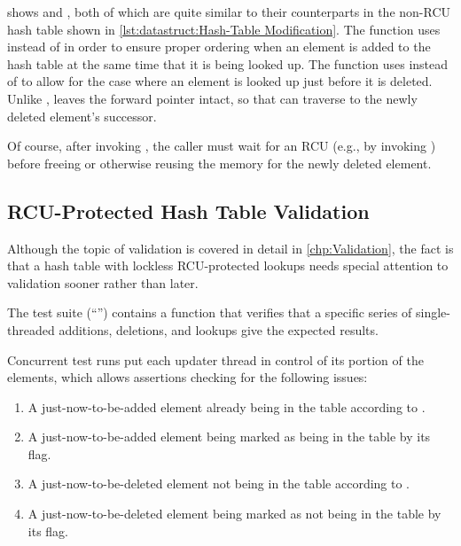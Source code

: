 shows  and , both of which
are quite similar to their counterparts in the non-RCU hash table
shown in
\cref{lst:datastruct:Hash-Table Modification}.
The  function uses  instead
of  in order to ensure proper ordering when
an element is added to the hash table at the same time that it is
being looked up.
The  function uses  instead
of  to allow for the case where an element is
looked up just before it is deleted.
Unlike ,  leaves the
forward pointer intact, so that  can traverse
to the newly deleted element's successor.

Of course, after invoking , the caller must wait for
an RCU  (e.g., by invoking ) before
freeing or otherwise reusing the memory for the newly deleted element.

\subsection{RCU-Protected Hash Table Validation}
\label{sec:datastruct:RCU-Protected Hash Table Validation}

Although the topic of validation is covered in detail in
\cref{chp:Validation}, the fact is that a hash table with lockless
RCU-protected lookups needs special attention to validation sooner rather
than later.

The test suite (``'') contains a 
function that verifies that a specific series of single-threaded
additions, deletions, and lookups give the expected results.

Concurrent test runs put each updater thread in control of its portion of
the elements, which allows assertions checking for the following issues:

\begin{enumerate}
\item	A just-now-to-be-added element already being in the table
	according to .
\item	A just-now-to-be-added element being marked as being in the
	table by its  flag.
\item	A just-now-to-be-deleted element not being in the table according
	to .
\item	A just-now-to-be-deleted element being marked as not being in
	the table by its  flag.
\end{enumerate}


